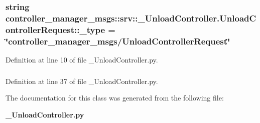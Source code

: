 \subsubsection[{\-\_\-type}]{\setlength{\rightskip}{0pt plus 5cm}string {\bf controller\-\_\-manager\-\_\-msgs\-::srv\-::\-\_\-\-Unload\-Controller.\-Unload\-Controller\-Request\-::\-\_\-type} = \char`\"{}controller\-\_\-manager\-\_\-msgs/{\bf \-Unload\-Controller\-Request}\char`\"{}\hspace{0.3cm}{\ttfamily  [static, private]}}\label{classcontroller__manager__msgs_1_1srv_1_1__UnloadController_1_1UnloadControllerRequest_a44f1905dfea8da3f79d7ad1e35b2c222}


\-Definition at line 10 of file \-\_\-\-Unload\-Controller.\-py.

\subsubsection[{name}]{}\label{classcontroller__manager__msgs_1_1srv_1_1__UnloadController_1_1UnloadControllerRequest_a899ad63d7b8017068814d36fe8a15814}


\-Definition at line 37 of file \-\_\-\-Unload\-Controller.\-py.



\-The documentation for this class was generated from the following file\-:\begin{DoxyCompactItemize}
\item 
{\bf \-\_\-\-Unload\-Controller.\-py}\end{DoxyCompactItemize}
